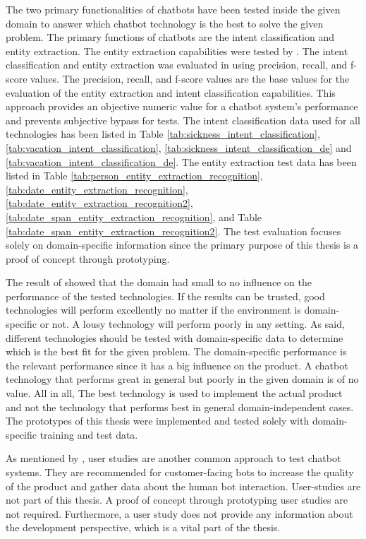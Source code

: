 The two primary functionalities of chatbots have been tested inside the given domain to answer which chatbot technology is the best to solve the given problem.
The primary functions of chatbots are the intent classification and entity extraction.
The entity extraction capabilities were tested by \citet{geyer2016named}.
The intent classification and entity extraction was evaluated in \citet{braunEvaluatingNLU} using precision, recall, and f-score values.
The precision, recall, and f-score values are the base values for the evaluation of the entity extraction and intent classification capabilities.
This approach provides an objective numeric value for a chatbot system's performance and prevents subjective bypass for tests.
The intent classification data used for all technologies has been listed in 
Table \ref{tab:sickness_intent_classification},
\ref{tab:vacation_intent_classification}, \ref{tab:sickness_intent_classification_de} and \ref{tab:vacation_intent_classification_de}.
The entity extraction test data has been listed in Table \ref{tab:person_entity_extraction_recognition}, 
\ref{tab:date_entity_extraction_recognition}, \ref{tab:date_entity_extraction_recognition2}, 
\ref{tab:date_span_entity_extraction_recognition}, and Table \ref{tab:date_span_entity_extraction_recognition2}.
The test evaluation focuses solely on domain-specific information since the primary purpose of this thesis is a proof of concept through prototyping.

The result of \citet{braunEvaluatingNLU} showed that the domain had small to no influence on the performance of the tested technologies.
If the results can be trusted, good technologies will perform excellently no matter if the environment is domain-specific or not.
A lousy technology will perform poorly in any setting.
As \citet{braunEvaluatingNLU} said, different technologies should be tested with domain-specific data to determine which is the best fit for the given problem.
The domain-specific performance is the relevant performance since it has a big influence on the product.
A chatbot technology that performs great in general but poorly in the given domain is of no value.
All in all, The best technology is used to implement the actual product and not the technology that performs best in general domain-independent cases.
The prototypes of this thesis were implemented and tested solely with domain-specific training and test data.

As mentioned by \citet{evaluateChatbotsShawar2007}, user studies are another common approach to test chatbot systems.
They are recommended for customer-facing bots to increase the quality of the product and gather data about the human bot interaction.
User-studies are not part of this thesis.
A proof of concept through prototyping user studies are not required.
Furthermore, a user study does not provide any information about the development perspective, which is a vital part of the thesis.

